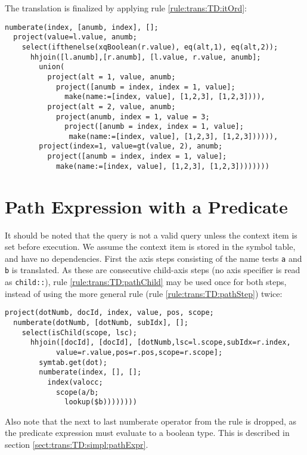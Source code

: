 The translation is finalized by applying rule \ref{rule:trans:TD:itOrd}:

\begin{Verbatim}
numberate(index, [anumb, index], [];
  project(value=l.value, anumb;
    select(ifthenelse(xqBoolean(r.value), eq(alt,1), eq(alt,2));
      hhjoin([l.anumb],[r.anumb], [l.value, r.value, anumb];
        union(
          project(alt = 1, value, anumb;
            project([anumb = index, index = 1, value];
              make(name:=[index, value], [1,2,3], [1,2,3]))),
          project(alt = 2, value, anumb;
            project(anumb, index = 1, value = 3;
              project([anumb = index, index = 1, value];
               make(name:=[index, value], [1,2,3], [1,2,3]))))),
        project(index=1, value=gt(value, 2), anumb;
          project([anumb = index, index = 1, value];
            make(name:=[index, value], [1,2,3], [1,2,3])))))))
\end{Verbatim}

\section{Path Expression with a Predicate}
\label{appendix:transl:pathPred}

It should be noted that the query is not a valid query unless the context item is set before execution. We assume
the context item is stored in the symbol table, and have no dependencies. First the axis steps consisting of the
name tests \texttt{a} and \texttt{b} is translated. As these are consecutive child-axis steps (no axis specifier
is read as \texttt{child::}), rule \ref{rule:trans:TD:pathChild} may be used once for both steps, instead of using
the more general rule (rule \ref{rule:trans:TD:pathStep}) twice:
\begin{Verbatim}
project(dotNumb, docId, index, value, pos, scope;
  numberate(dotNumb, [dotNumb, subIdx], [];
    select(isChild(scope, lsc);
      hhjoin([docId], [docId], [dotNumb,lsc=l.scope,subIdx=r.index,
            value=r.value,pos=r.pos,scope=r.scope];
        symtab.get(dot);
        numberate(index, [], [];
          index(valocc;
            scope(a/b;
              lookup($b))))))))
\end{Verbatim}
Also note that the next to last \textsf{numberate} operator from the rule is dropped, as the predicate expression
must evaluate to a boolean type. This is described in section \ref{sect:trans:TD:simpl:pathExpr}.

